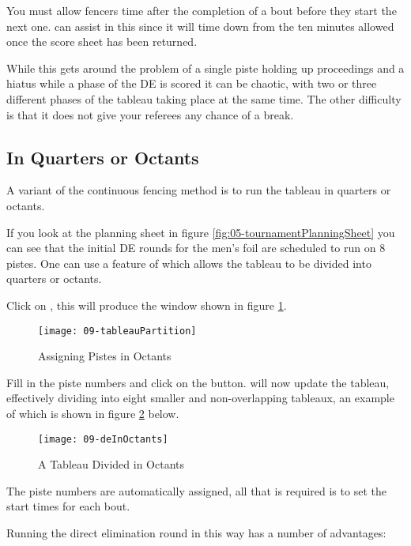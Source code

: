 \documentclass[a4paper,11pt]{memoir}
\begin{document}
You must allow fencers time after the completion of a bout before they start the next one. \fencingtime{} can assist in this since it will time down from the ten minutes allowed once the score sheet has been returned.

While this gets around the problem of a single piste holding up proceedings and a hiatus while a phase of the DE is scored it can be chaotic, with two or three different phases of the tableau taking place at the same time. The other difficulty is that it does not give your referees any chance of a break.

\subsection{In Quarters or Octants}

A variant of the continuous fencing method is to run the tableau in quarters or octants. 

If you look at the planning sheet in figure \ref{fig:05-tournamentPlanningSheet} you can see that the initial DE rounds for the men's foil are scheduled to run on 8 pistes. One can use a feature of \fencingtime{} which allows the tableau to be divided into quarters or octants. 

Click on , this will produce the window shown in figure \ref{fig:09-tableauPartition}.

\begin{figure}[!ht]
 \centering
 \texttt{[image: 09-tableauPartition]}
 \caption{Assigning Pistes in Octants} \label{fig:09-tableauPartition}
\end{figure}

Fill in the piste numbers and click on the  button. \fencingtime{} will now update the tableau, effectively dividing into eight smaller and non-overlapping tableaux, an example of which is shown in figure \ref{fig:09-deInOctants} below.

\begin{figure}[!ht]
 \centering
 \texttt{[image: 09-deInOctants]}
 \caption{A Tableau Divided in Octants} \label{fig:09-deInOctants}
\end{figure}

The piste numbers are automatically assigned, all that is required is to set the start times for each bout. 

Running the direct elimination round in this way has a number of advantages:
\end{document}
